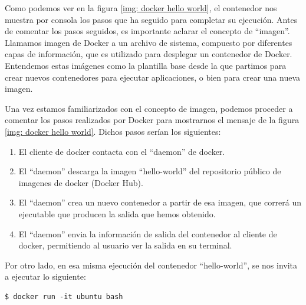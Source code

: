\documentclass[a4paper, oneside, 12pt]{book}
\begin{document}
	\noindent Como podemos ver en la figura \ref{img: docker hello world}, el contenedor nos muestra por consola los pasos que ha seguido para completar su ejecución. Antes de comentar los pasos seguidos, es importante aclarar el concepto de ``imagen''. \\
	
	\noindent Llamamos imagen de Docker a un archivo de sistema, compuesto por diferentes capas de información, que es utilizado para desplegar un contenedor de Docker. Entendemos estas imágenes como la plantilla base desde la que partimos para crear nuevos contenedores para ejecutar aplicaciones, o bien para crear una nueva imagen.\\
	
	\pagebreak
	
	\noindent Una vez estamos familiarizados con el concepto de imagen, podemos proceder a comentar los pasos realizados por Docker para mostrarnos el mensaje de la figura \ref{img: docker hello world}. Dichos pasos serían los siguientes:
	\begin{enumerate}
		\item El cliente de docker contacta con el ``daemon'' de docker.
		\item El ``daemon'' descarga la imagen  ``hello-world'' del repositorio público de imagenes de docker (Docker Hub).
		\item El ``daemon'' crea un nuevo contenedor a partir de esa imagen, que correrá un ejecutable que producen la salida que hemos obtenido.
		\item El ``daemon'' envia la información de salida del contenedor al cliente de docker, permitiendo al usuario ver la salida en su terminal.
	\end{enumerate}

	\noindent Por otro lado, en esa misma ejecución del contenedor ``hello-world'', se nos invita a ejecutar lo siguiente:
	\begin{verbatim}
$ docker run -it ubuntu bash
	\end{verbatim}
\end{document}
